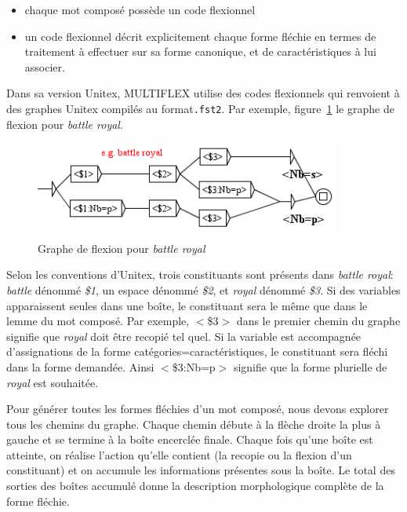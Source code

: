\begin{itemize}
\item chaque mot composé possède un code flexionnel
\item un code flexionnel décrit explicitement chaque forme fléchie en termes de traitement à
	effectuer sur sa forme canonique, et de caractéristiques à lui associer.
\end{itemize}

\bigskip
\noindent Dans sa version Unitex, MULTIFLEX utilise des codes flexionnels qui renvoient à des graphes
Unitex compilés au format\verb+.fst2+. Par exemple, figure~\ref{fig:BattleRoyal} le graphe de flexion pour \emph{battle royal}.

\begin{figure}[!htb]
  \centering
  \includegraphics[width=10cm]{resources/img/BattleRoyal.png}
  \caption{Graphe de flexion pour \emph{battle royal}}
  \label{fig:BattleRoyal}
\end{figure}

\bigskip
\noindent Selon les conventions d'Unitex, trois constituants sont présents dans \emph{battle royal}:
\emph{battle} dénommé \emph{\$1}, un espace dénommé \emph{\$2}, et \emph{royal} dénommé \emph{\$3}.
Si des variables apparaissent seules dans une boîte, le constituant sera le même que dans le  lemme
du mot composé. Par exemple, $<$\$3$>$ dans le premier chemin du graphe signifie que \emph{royal}
doit être recopié tel quel. Si la variable est accompagnée d'assignations de la forme
catégories=caractéristiques, le constituant sera fléchi dans la forme demandée. Ainsi $<$\$3:Nb=p$>$
signifie que la  forme plurielle de \emph{royal} est souhaitée.

\bigskip
\noindent Pour générer toutes les formes fléchies d'un mot composé, nous devons explorer tous les
chemins du graphe. Chaque chemin débute à la flèche droite la plus à gauche et se termine à la 
boîte encerclée finale. Chaque fois qu'une boîte est atteinte, on réalise l'action qu'elle contient
(la recopie ou la flexion d'un constituant) et on accumule les informations présentes sous la boîte.
Le total des sorties des boîtes accumulé donne la description morphologique complète de la forme
fléchie.

